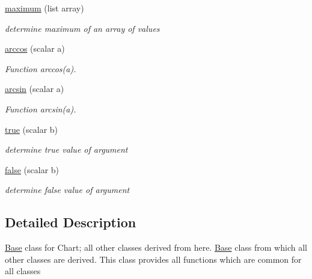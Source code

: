 \begin{DoxyCompactItemize}
\hyperlink{classChart_1_1Base_a3dd0d7d961b05b92020c476958b8e0a0}{maximum} (list array)
\begin{DoxyCompactList}\small\item\em determine maximum of an array of values \item\end{DoxyCompactList}\item 
\hyperlink{classChart_1_1Base_a97d3b67d31850ded3a7406a18c464ec9}{arccos} (scalar a)
\begin{DoxyCompactList}\small\item\em Function arccos(a). \item\end{DoxyCompactList}\item 
\hyperlink{classChart_1_1Base_a7da994b0d4ecf66262b4119745e38123}{arcsin} (scalar a)
\begin{DoxyCompactList}\small\item\em Function arcsin(a). \item\end{DoxyCompactList}\item 
\hyperlink{classChart_1_1Base_a9687d15b6d69b6a950f2b545940e62cd}{true} (scalar b)
\begin{DoxyCompactList}\small\item\em determine true value of argument \item\end{DoxyCompactList}\item 
\hyperlink{classChart_1_1Base_a72935251f89ad5d823649db7e07a3103}{false} (scalar b)
\begin{DoxyCompactList}\small\item\em determine false value of argument \item\end{DoxyCompactList}\end{DoxyCompactItemize}


\subsection{Detailed Description}
\hyperlink{classChart_1_1Base}{Base} class for Chart; all other classes derived from here. \hyperlink{classChart_1_1Base}{Base} class from which all other classes are derived. This class provides all functions which are common for all classes 

